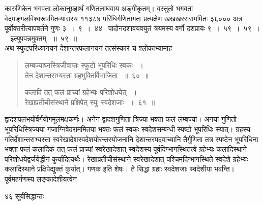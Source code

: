 \documentclass[11pt, openany]{book}
\begin{document}
\begin{sloppypar}
\noindent कारुणिकेन भगवता लोकानुग्रहार्थं गणितलाघवाय अङ्गीकृतम्। वस्तुतो भगवता वेदमङ्गलविश्वरूपमितव्यासस्य ११३८४ परिधिर्गणितागतः प्रत्यक्षेण खखखरसराममितः ३६००० अत्र पूर्वोक्तरीत्यापवर्तने गुणः ३~।~९~।~४४~ पादोनदशावयवयुतं त्रयमस्य वर्गो दशप्रायः ९~।~५९~।~५९~।~ इत्युपपन्नमुक्तम् ~॥~५९~॥\\  
\noindent अथ स्फुटपरिध्यानयनं देशान्तरफलानयनं तत्संस्कारं च श्लोकाभ्यामाह\textendash
\end{sloppypar}
\begin{quote}

  {\ssi लम्बज्याघ्नस्त्रिजीवाप्तः स्फुटो भूपरिधिः स्वकः ~।\\
तेन देशान्तराभ्यस्ता ग्रहभुक्तिर्विभाजिता ~॥~६०~॥

कलादि तत् फलं प्राच्यां ग्रहेभ्यः परिशोधयेत् ~।\\
रेखाप्रतीचीसंस्थाने प्रक्षिपेत् स्युः स्वदेशजाः ~॥~६१~॥}
\end{quote}
\begin{sloppypar}
 द्वादशपलभयोर्वर्गयोगमूलमक्षकर्णः। अनेन द्वादशगुणिता त्रिज्या भक्ता फलं लम्बज्या। अनया गुणितो भूपरिधिस्त्रिज्यया गजाग्निवेदराममितया भक्तः फलं स्वकः स्वदेशसम्बन्धी स्पष्टो भूपरिधिः स्यात्। ग्रहस्य गतिर्देशान्तराभ्यस्ता स्वरेखादेशस्वदेशयोरन्तरयोजनानि देशान्तरपदवाच्यानि तैर्गुणिता तत्र स्पष्टेन भूपरिधिना भक्ता फलं कलादिकं तत् फलं प्राच्यां स्वरेखादेशात् स्वदेशस्य पूर्वदिग्भागस्थितत्वे ग्रहेभ्यः कलादिस्थाने परिशोधयेद्वर्जयेद्धीनं कुर्यादित्यर्थः। रेखाप्रतीचीसंस्थाने स्वरेखादेशात् पश्चिमदिग्भागस्थिते स्वदेशे ग्रहेभ्यः कलादिस्थाने प्रक्षिपेद्युक्तं कुर्यात्। गणक इति शेषः। ते सिद्धा ग्रहाः स्वदेशजाः स्वदेशीया भवन्ति। पूर्वमहर्गणस्य लङ्कादेशीयत्वेन
\end{sloppypar}

\newpage

\noindent४६ \hspace{4cm} सूर्यसिद्धान्तः
\vspace{1cm}
\end{document}
